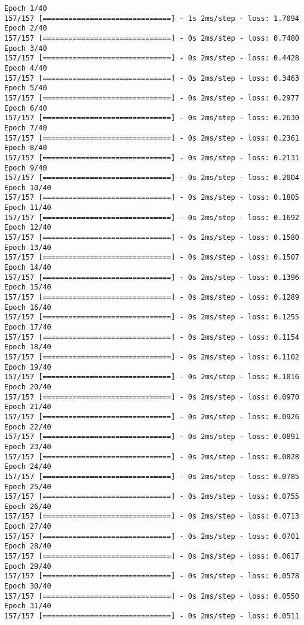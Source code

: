 \documentclass[11pt]{article}
\begin{document}
    \begin{Verbatim}[commandchars=\\\{\}]
Epoch 1/40
157/157 [==============================] - 1s 2ms/step - loss: 1.7094
Epoch 2/40
157/157 [==============================] - 0s 2ms/step - loss: 0.7480
Epoch 3/40
157/157 [==============================] - 0s 2ms/step - loss: 0.4428
Epoch 4/40
157/157 [==============================] - 0s 2ms/step - loss: 0.3463
Epoch 5/40
157/157 [==============================] - 0s 2ms/step - loss: 0.2977
Epoch 6/40
157/157 [==============================] - 0s 2ms/step - loss: 0.2630
Epoch 7/40
157/157 [==============================] - 0s 2ms/step - loss: 0.2361
Epoch 8/40
157/157 [==============================] - 0s 2ms/step - loss: 0.2131
Epoch 9/40
157/157 [==============================] - 0s 2ms/step - loss: 0.2004
Epoch 10/40
157/157 [==============================] - 0s 2ms/step - loss: 0.1805
Epoch 11/40
157/157 [==============================] - 0s 2ms/step - loss: 0.1692
Epoch 12/40
157/157 [==============================] - 0s 2ms/step - loss: 0.1580
Epoch 13/40
157/157 [==============================] - 0s 2ms/step - loss: 0.1507
Epoch 14/40
157/157 [==============================] - 0s 2ms/step - loss: 0.1396
Epoch 15/40
157/157 [==============================] - 0s 2ms/step - loss: 0.1289
Epoch 16/40
157/157 [==============================] - 0s 2ms/step - loss: 0.1255
Epoch 17/40
157/157 [==============================] - 0s 2ms/step - loss: 0.1154
Epoch 18/40
157/157 [==============================] - 0s 2ms/step - loss: 0.1102
Epoch 19/40
157/157 [==============================] - 0s 2ms/step - loss: 0.1016
Epoch 20/40
157/157 [==============================] - 0s 2ms/step - loss: 0.0970
Epoch 21/40
157/157 [==============================] - 0s 2ms/step - loss: 0.0926
Epoch 22/40
157/157 [==============================] - 0s 2ms/step - loss: 0.0891
Epoch 23/40
157/157 [==============================] - 0s 2ms/step - loss: 0.0828
Epoch 24/40
157/157 [==============================] - 0s 2ms/step - loss: 0.0785
Epoch 25/40
157/157 [==============================] - 0s 2ms/step - loss: 0.0755
Epoch 26/40
157/157 [==============================] - 0s 2ms/step - loss: 0.0713
Epoch 27/40
157/157 [==============================] - 0s 2ms/step - loss: 0.0701
Epoch 28/40
157/157 [==============================] - 0s 2ms/step - loss: 0.0617
Epoch 29/40
157/157 [==============================] - 0s 2ms/step - loss: 0.0578
Epoch 30/40
157/157 [==============================] - 0s 2ms/step - loss: 0.0550
Epoch 31/40
157/157 [==============================] - 0s 2ms/step - loss: 0.0511

\end{Verbatim}
\end{document}
